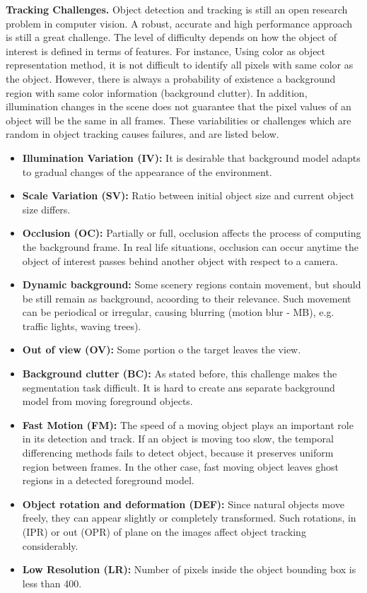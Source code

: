 \textbf{Tracking Challenges. }Object detection and tracking is still an open
research problem in computer
vision. A robust, accurate and high performance approach is still a great
challenge. The level of difficulty depends on how the object of interest is
defined in terms of features. For instance, Using color as object representation
method, it is not difficult to identify all pixels with same color as the
object. However, there is always a probability of existence a background region
with same color information (background clutter). In addition, illumination
changes in the scene does not guarantee that the pixel values of an object
will be the same in all frames. These variabilities or challenges which are
random in object tracking causes failures, and are listed below.

\begin{itemize}
\item \textbf{Illumination Variation (IV):} It is desirable that background
model adapts to gradual changes of the appearance of the environment.
\item \textbf{Scale Variation (SV):} Ratio between initial object size and
current object size differs.
\item \textbf{Occlusion (OC):} Partially or full, occlusion affects the process
of computing the background frame. In real life situations, occlusion can occur
anytime the object of interest passes behind another object with respect to a
camera.
\item \textbf{Dynamic background:} Some scenery regions contain movement, but
should be still remain as background, acoording to their relevance. Such
movement can be periodical or irregular, causing blurring (motion blur - MB),
e.g. traffic lights, waving trees).
\item \textbf{Out of view (OV): } Some portion o the target leaves the view.
\item \textbf{Background clutter (BC):} As stated before, this challenge makes
the segmentation task difficult. It is hard to create ans separate background
model from moving foreground objects.
\item \textbf{Fast Motion (FM):} The speed of a moving object plays an
important role in its detection and track. If an object is moving too slow,
the temporal differencing methods fails to detect object, because it preserves
uniform region between frames. In the other case, fast moving object leaves
ghost regions in a detected foreground model.
\item \textbf{Object rotation and deformation (DEF):} Since natural objects
move freely, they can appear slightly or completely transformed. Such
rotations, in (IPR) or out (OPR) of plane on the images affect object tracking
considerably.
\item \textbf{Low Resolution (LR):} Number of pixels inside the object
bounding box is less than 400.
\end{itemize}

